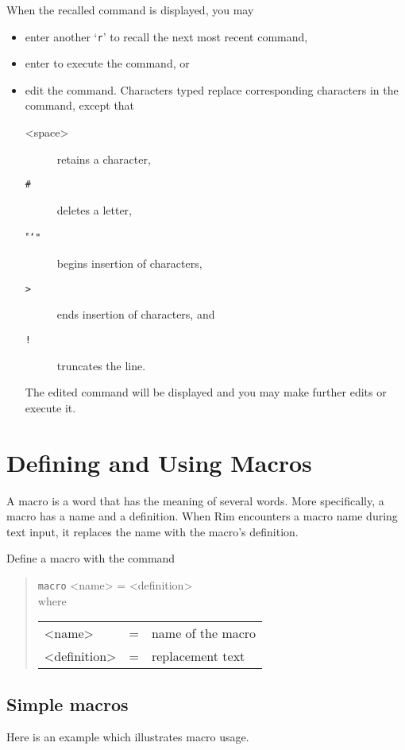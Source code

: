 \documentclass[11pt,a4paper]{report}
\begin{document}
When the recalled command is displayed, you may
 
\begin{itemize}
\item enter another `\verb!r!' to recall the next most recent command,
\item enter  to execute the command, or
\item edit the command.  Characters typed replace corresponding
  characters in the command, except that
 
  \begin{description}
  \item[<space>] retains a character,
  \item[\tt \#] deletes a letter,
  \item["\tt \char`"] begins insertion of characters,
  \item[\tt >] ends insertion of characters, and
  \item[\tt !] truncates the line.
  \end{description}
 
  The edited command will be displayed and you may make further
  edits or execute it.
 
\end{itemize}
 
%
%
\chapter{Defining and Using Macros}
\label{mac-chapter}
A macro is a word that has the meaning of several words.
More specifically, a macro has a name and a definition.
When Rim encounters a macro name during text input, it
replaces the name with the macro's definition.
 
Define a macro with the command
\begin{verse}
  \verb!macro! <name> = <definition> \\
where
 \begin{tabular}{lcl}
   <name> &=& name of the macro\\
   <definition> &=& replacement text
   \end{tabular}
  \end{verse}
\section{Simple macros}
Here is an example which illustrates macro usage.
 
\end{document}
